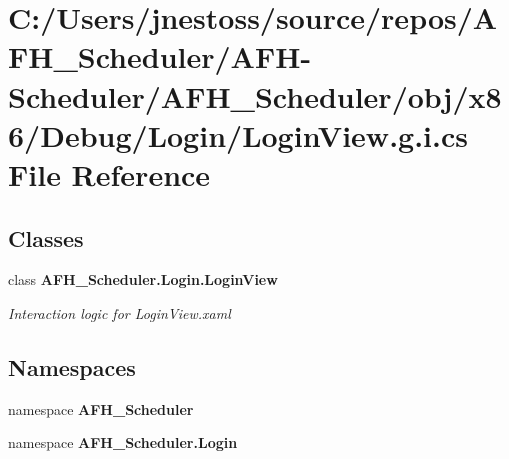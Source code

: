 \section{C\+:/\+Users/jnestoss/source/repos/\+A\+F\+H\+\_\+\+Scheduler/\+A\+F\+H-\/\+Scheduler/\+A\+F\+H\+\_\+\+Scheduler/obj/x86/\+Debug/\+Login/\+Login\+View.g.\+i.\+cs File Reference}
\label{x86_2_debug_2_login_2_login_view_8g_8i_8cs}
\subsection*{Classes}
\begin{DoxyCompactItemize}
\item 
class \textbf{ A\+F\+H\+\_\+\+Scheduler.\+Login.\+Login\+View}
\begin{DoxyCompactList}\small\item\em Interaction logic for Login\+View.\+xaml \end{DoxyCompactList}\end{DoxyCompactItemize}
\subsection*{Namespaces}
\begin{DoxyCompactItemize}
\item 
namespace \textbf{ A\+F\+H\+\_\+\+Scheduler}
\item 
namespace \textbf{ A\+F\+H\+\_\+\+Scheduler.\+Login}
\end{DoxyCompactItemize}
